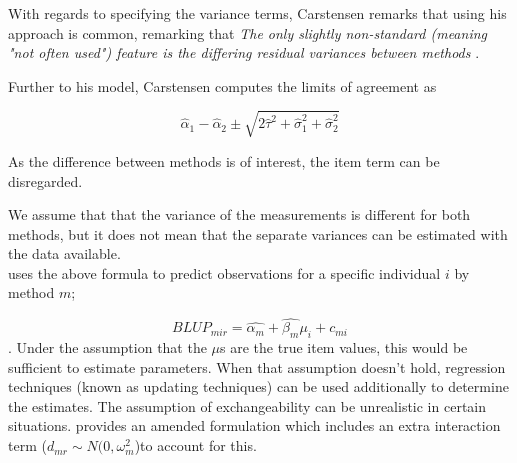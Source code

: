 \documentclass[12pt, a4paper]{report}
\theoremstyle{plain}
\theoremstyle{definition}
\theoremstyle{remark}
\begin{document}
With regards to specifying the variance terms, Carstensen remarks that using his approach is common, remarking that \emph{
	The only slightly non-standard (meaning "not often used") feature is the differing residual variances between methods }\citep{BXC2010}.



Further to his model, Carstensen computes the limits of agreement
as

\[
\hat{\alpha}_1 - \hat{\alpha}_2 \pm \sqrt{2 \hat{\tau}^2 +
	\hat{\sigma}^2_1 + \hat{\sigma}^2_2}
\]



As the difference between methods is of interest, the item term can be disregarded.

We assume that that the variance of the measurements is different for both methods, but it does not mean that the separate variances can be estimated with the data available.\\




















\citet{BXC2004} uses the above formula to predict observations for
a specific individual $i$ by method $m$;

\begin{equation}BLUP_{mir} = \hat{\alpha_{m}} + \hat{\beta_{m}}\mu_{i} +
c_{mi} \end{equation}. Under the assumption that the $\mu$s are
the true item values, this would be sufficient to estimate parameters. When that assumption doesn't hold, regression techniques (known as updating techniques) can be used additionally to determine the estimates. The assumption of exchangeability can
be unrealistic in certain situations. \citet{BXC2004} provides an amended formulation which includes an extra interaction term ($d_{mr} \sim N(0,\omega^{2}_{m}$)to account for this.
\end{document}
